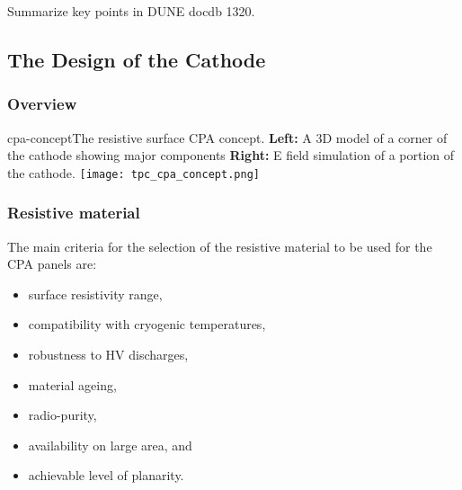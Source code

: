 Summarize key points in DUNE docdb 1320. 

\subsection{The Design of the Cathode}

\subsubsection{Overview}


\begin{cdrfigure}{cpa-concept}{The resistive surface CPA concept. 
 {\bf Left:} A 3D model of a corner of the cathode showing major components {\bf Right:} E field simulation of a portion of the cathode.} 
\texttt{[image: tpc\_cpa\_concept.png]}
\end{cdrfigure}


\subsubsection{Resistive material}

The main criteria for the selection of the resistive material to be used for the CPA panels are: 
\begin{itemize}	
\item surface resistivity range,
\item compatibility with cryogenic temperatures,
\item robustness to HV discharges, 
\item material ageing,
\item radio-purity,
\item availability on large area, and 
\item achievable level of planarity. 
\end{itemize}

